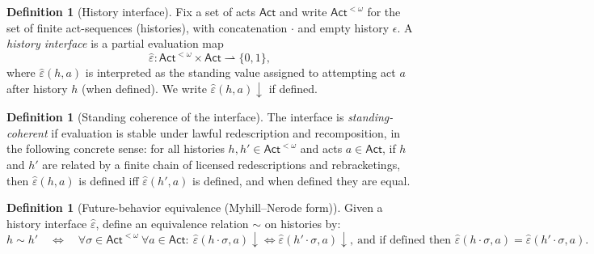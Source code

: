 \documentclass[11pt]{article}
\theoremstyle{definition}
\newtheorem{definition}[theorem]{Definition}
\newcommand{\Act}{\mathsf{Act}}
\newcommand{\ppar}{\rightharpoonup} %
\begin{document}
\begin{definition}[History interface]
Fix a set of acts $\Act$ and write $\Act^{<\omega}$ for the set of finite act-sequences (histories), with concatenation $\cdot$
and empty history $\epsilon$.
A \emph{history interface} is a partial evaluation map
\[
\hat\varepsilon:\Act^{<\omega}\times \Act \ppar \{0,1\},
\]
where $\hat\varepsilon(h,a)$ is interpreted as the standing value assigned to attempting act $a$ after history $h$ (when
defined).  We write $\hat\varepsilon(h,a)\downarrow$ if defined.
\end{definition}

\begin{definition}[Standing coherence of the interface]
The interface is \emph{standing-coherent} if evaluation is stable under lawful redescription and recomposition, in the
following concrete sense:
for all histories $h,h'\in\Act^{<\omega}$ and acts $a\in\Act$, if $h$ and $h'$ are related by a finite chain of licensed
redescriptions and rebracketings, then $\hat\varepsilon(h,a)$ is defined iff $\hat\varepsilon(h',a)$ is defined, and when
defined they are equal.
\end{definition}

\begin{definition}[Future-behavior equivalence (Myhill--Nerode form)]
Given a history interface $\hat\varepsilon$, define an equivalence relation $\sim$ on histories by:
\[
h\sim h' \quad\Longleftrightarrow\quad
\forall \sigma\in\Act^{<\omega}\ \forall a\in\Act:\ 
\hat\varepsilon(h\cdot\sigma,a)\downarrow \iff \hat\varepsilon(h'\cdot\sigma,a)\downarrow,\ \text{and if defined then }
\hat\varepsilon(h\cdot\sigma,a)=\hat\varepsilon(h'\cdot\sigma,a).
\]
\end{definition}
\end{document}
